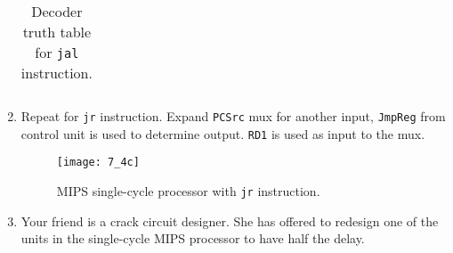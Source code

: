 \documentclass[a4paper]{article}
\begin{document}
\begin{enumerate}
\begin{table}[ht]
{\begin{tabular}{| c c c c c c c c c |}
				\hline
				\end{tabular}
                		}
			\caption{Decoder truth table for \texttt{jal} instruction.}
        		\label{tab:jal_truth_table}
        		\end{table}
			\pagebreak
		\item Repeat for \texttt{jr} instruction.
			Expand \texttt{PCSrc} mux for another input, \texttt{JmpReg} from control
			unit is used to determine output. \texttt{RD1} is used as input to the mux.
			\begin{figure}[ht]
				\centering
				\texttt{[image: 7\_4c]}
				\caption{MIPS single-cycle processor with \texttt{jr} instruction.}
				\label{fig:7_4c}
			\end{figure}
			\begin{table}[h!]
                                \noindent{}
                        \caption{Decoder truth table for \texttt{jr} instruction.}
                        \label{tab:jr_truth_table}
                        \end{table}
			\pagebreak
		\item Your friend is a crack circuit designer. She has offered to redesign one
			of the units in the single-cycle MIPS processor to have half the delay.

\end{enumerate}
\end{document}
